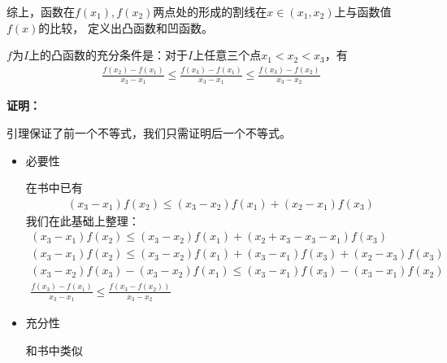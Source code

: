 \documentclass{article}
\begin{document}
综上，函数在$f(x_1), f(x_2)$两点处的形成的割线在$x \in (x_1, x_2)$上与函数值$f(x)$的比较，
定义出凸函数和凹函数。

\begin{zremark}
  $f$为$I$上的凸函数的充分条件是：对于$I$上任意三个点$x_1 < x_2 < x_3$，有
  \begin{align*}
    \frac{f(x_2) - f(x_1)}{x_2 - x_1} \leq \frac{f(x_3) - f(x_1)}{x_3 - x_1} \leq \frac{f(x_3) - f(x_2)}{x_3 - x_2}
  \end{align*}
\end{zremark}

\textbf{证明：}

引理保证了前一个不等式，我们只需证明后一个不等式。

\begin{itemize}
  \item 必要性

        在书中已有
        \begin{align*}
          (x_3 - x_1) f(x_2) \leq (x_3 - x_2)f(x_1) + (x_2 - x_1)f(x_3)
        \end{align*}
        我们在此基础上整理：
        \begin{align*}
          (x_3 - x_1) f(x_2) \leq (x_3 - x_2)f(x_1) + (x_2 + x_3 - x_3 - x_1)f(x_3)          \\
          (x_3 - x_1) f(x_2) \leq (x_3 - x_2)f(x_1) + (x_3 - x_1)f(x_3) + (x_2 - x_3)f(x_3)  \\
          (x_3 - x_2)f(x_3) - (x_3 - x_2)f(x_1) \leq  (x_3 - x_1)f(x_3) - (x_3 - x_1) f(x_2) \\
          \frac{f(x_3) - f(x_1)}{x_3 - x_1} \leq \frac{f(x_3 - f(x_2))}{x_3 - x_2}
        \end{align*}

  \item 充分性

        和书中类似

\end{itemize}
\end{document}
